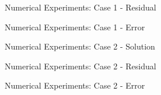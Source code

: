 \documentclass{beamer}
\begin{document}
\begin{frame}{Numerical Experiments: Case 1 - Residual}

\end{frame}

\begin{frame}{Numerical Experiments: Case 1 - Error}

\end{frame}

\begin{frame}{Numerical Experiments: Case 2 - Solution}

\end{frame}

\begin{frame}{Numerical Experiments: Case 2 - Residual}

\end{frame}

\begin{frame}{Numerical Experiments: Case 2 - Error}

\end{frame}

\end{document}
